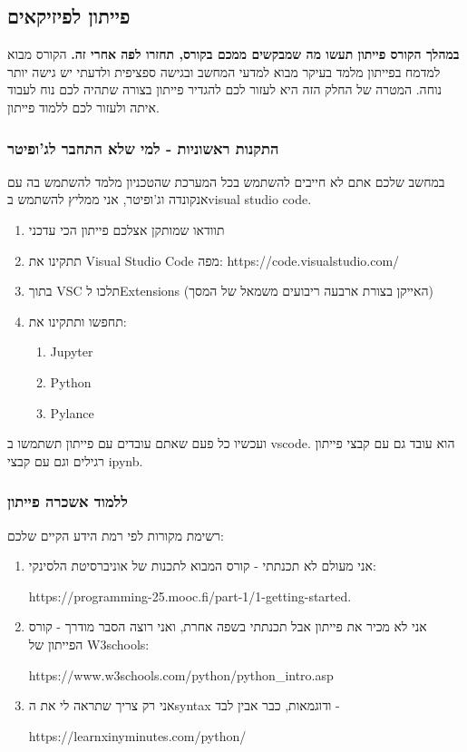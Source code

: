 \documentclass[a4paper,12pt]{article}
\begin{document}
\subsection{פייתון לפיזיקאים}\label{pythonlearn}

\textbf{במהלך הקורס פייתון תעשו מה שמבקשים ממכם בקורס, תחזרו לפה אחרי זה.} הקורס מבוא למדמח בפייתון מלמד בעיקר מבוא למדעי המחשב ובגישה ספציפית ולדעתי יש גישה יותר נוחה. המטרה של החלק הזה היא לעזור לכם להגדיר פייתון בצורה שתהיה לכם נוח לעבוד איתה ולעזור לכם ללמוד פייתון. 

\subsubsection{התקנות ראשוניות - למי שלא התחבר לג'ופיטר}

במחשב שלכם אתם לא חייבים להשתמש בכל המערכת שהטכניון מלמד להשתמש בה עם אנקונדה וג'ופיטר, אני ממליץ להשתמש ב\textenglish{visual studio code}.

\begin{enumerate}
    \item תוודאו שמותקן אצלכם פייתון הכי עדכני
    \item תתקינו את \textenglish{Visual Studio Code} מפה: https://code.visualstudio.com/
    \item בתוך \textenglish{VSC} תלכו ל\textenglish{Extensions} (האייקן בצורת ארבעה ריבועים משמאל של המסך)
    \item תחפשו ותתקינו את: \begin{enumerate}
        \item \textenglish{Jupyter}
        \item \textenglish{Python}
        \item \textenglish{Pylance}
    \end{enumerate}
\end{enumerate}

ועכשיו כל פעם שאתם עובדים עם פייתון תשתמשו ב \textenglish{vscode}. הוא עובד גם עם קבצי פייתון רגילים וגם עם קבצי \textenglish{ipynb}.

\subsubsection{ללמוד אשכרה פייתון}

רשימת מקורות לפי רמת הידע הקיים שלכם:

\begin{enumerate}
    \item אני מעולם לא תכנתתי - קורס המבוא לתכנות של אוניברסיטת הלסינקי: 
    
    \textenglish{https://programming-25.mooc.fi/part-1/1-getting-started}.  
    \item אני לא מכיר את פייתון אבל תכנתתי בשפה אחרת, ואני רוצה הסבר מודרך - קורס הפייתון של \textenglish{W3schools}: 
    
    \textenglish{https://www.w3schools.com/python/python\_intro.asp}
    \item אני רק צריך שתראה לי את ה\textenglish{syntax} ודוגמאות, כבר אבין לבד - 
    
    \textenglish{https://learnxinyminutes.com/python/}
\end{enumerate}
\end{document}
